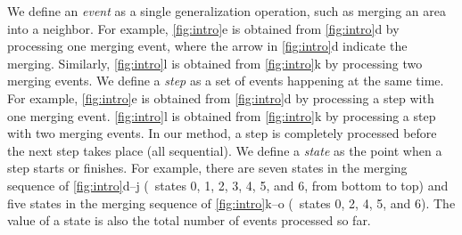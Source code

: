 \documentclass[ijgi,article,submit,moreauthors,pdftex]{Definitions/mdpi}
\begin{document}


We define an \emph{event} as a single generalization operation, 
such as merging an area into a neighbor.
For example, \fig\ref{fig:intro}e is obtained from 
\fig\ref{fig:intro}d by processing one merging event,
where the arrow in \fig\ref{fig:intro}d indicate the merging.
Similarly, \fig\ref{fig:intro}l is obtained from 
\fig\ref{fig:intro}k by processing two merging events.
We define a \emph{step} as 
a set of events happening at the same time.
For example, 
\fig\ref{fig:intro}e is obtained from 
\fig\ref{fig:intro}d by processing a step with one merging event.
\fig\ref{fig:intro}l is obtained from 
\fig\ref{fig:intro}k by processing a step with two merging events.
In our method, a step is completely processed 
before the next step takes place (all sequential).
We define a \emph{state} as the point when a step starts or finishes.
For example, there are seven states in the merging sequence of \figs\ref{fig:intro}d--j
(\ie~states 0, 1, 2, 3, 4, 5, and 6, from bottom to top)
and five states in the merging sequence of \figs\ref{fig:intro}k--o 
(\ie~states 0, 2, 4, 5, and 6).
The value of a state is also the total number of events processed so far.

\end{document}
